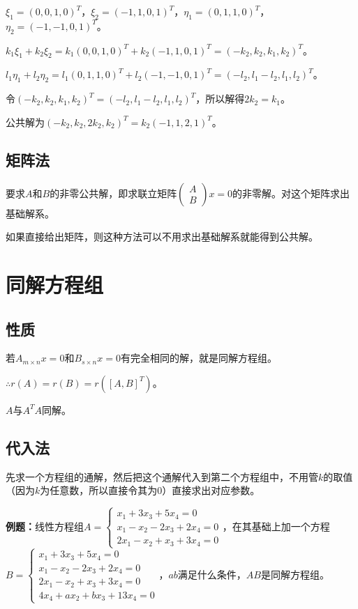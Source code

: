 \documentclass[UTF8, 12pt]{ctexart}
\begin{document}
$\xi_1=(0,0,1,0)^T$，$\xi_2=(-1,1,0,1)^T$，$\eta_1=(0,1,1,0)^T$，$\eta_2=(-1,-1,0,1)^T$。

$k_1\xi_1+k_2\xi_2=k_1(0,0,1,0)^T+k_2(-1,1,0,1)^T=(-k_2,k_2,k_1,k_2)^T$。

$l_1\eta_1+l_2\eta_2=l_1(0,1,1,0)^T+l_2(-1,-1,0,1)^T=(-l_2,l_1-l_2,l_1,l_2)^T$。

令$(-k_2,k_2,k_1,k_2)^T=(-l_2,l_1-l_2,l_1,l_2)^T$，所以解得$2k_2=k_1$。

公共解为$(-k_2,k_2,2k_2,k_2)^T=k_2(-1,1,2,1)^T$。

\subsection{矩阵法}

要求$A$和$B$的非零公共解，即求联立矩阵$\left(\begin{array}{c}
    A \\
    B
\end{array}\right)x=0$的非零解。对这个矩阵求出基础解系。

如果直接给出矩阵，则这种方法可以不用求出基础解系就能得到公共解。

\section{同解方程组}

\subsection{性质}

若$A_{m\times n}x=0$和$B_{s\times n}x=0$有完全相同的解，就是同解方程组。

$\therefore r(A)=r(B)=r([A,B]^T)$。

$A$与$A^TA$同解。

\subsection{代入法}

先求一个方程组的通解，然后把这个通解代入到第二个方程组中，不用管$k$的取值（因为$k$为任意数，所以直接令其为0）直接求出对应参数。

\textbf{例题：}线性方程组$A=\left\{\begin{array}{l}
    x_1+3x_3+5x_4=0 \\
    x_1-x_2-2x_3+2x_4=0 \\
    2x_1-x_2+x_3+3x_4=0
\end{array}\right.$，在其基础上加一个方程$B=\left\{\begin{array}{l}
    x_1+3x_3+5x_4=0 \\
    x_1-x_2-2x_3+2x_4=0 \\
    2x_1-x_2+x_3+3x_4=0 \\
    4x_4+ax_2+bx_3+13x_4=0
\end{array}\right.$，$ab$满足什么条件，$AB$是同解方程组。
\end{document}
